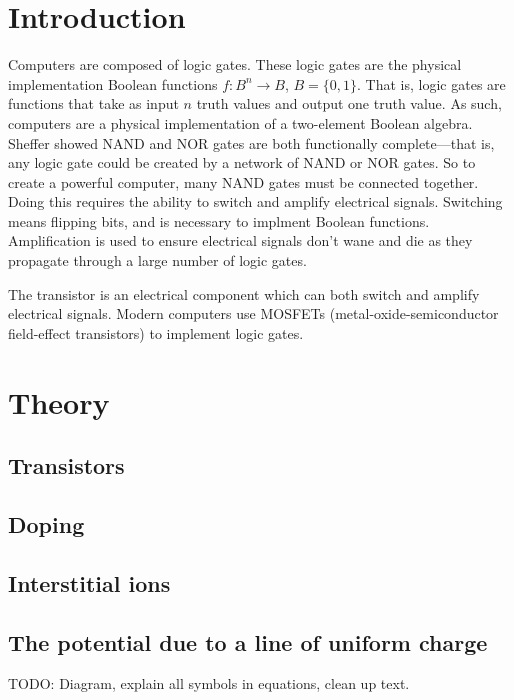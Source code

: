 \documentclass[]{article}
\begin{document}
\tableofcontents

\section{Introduction}
Computers are composed of logic gates. These logic gates are the physical implementation Boolean functions $f:B^n \rightarrow B$, $B=\{0,1\}$. That is, logic gates are functions that take as input $n$ truth values and output one truth value. As such, computers are a physical implementation of a two-element Boolean algebra. Sheffer showed NAND and NOR gates are both functionally complete---that is, any logic gate could be created by a network of NAND or NOR gates. So to create a powerful computer, many NAND gates must be connected together. Doing this requires the ability to switch and amplify electrical signals. Switching means flipping bits, and is necessary to implment Boolean functions. Amplification is used to ensure electrical signals don't wane and die as they propagate through a large number of logic gates. 

The transistor is an electrical component which can both switch and amplify electrical signals. Modern computers use MOSFETs (metal-oxide-semiconductor field-effect transistors) to implement logic gates.


\section{Theory}

\subsection{Transistors}

\subsection{Doping}

\subsection{Interstitial ions}

\subsection{The potential due to a line of uniform charge}
TODO: Diagram, explain all symbols in equations, clean up text.
\end{document}
